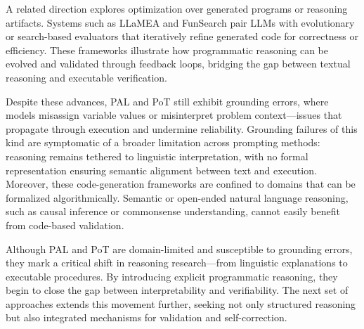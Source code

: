 \documentclass[project]{bsu-cs}  %
\begin{document}
A related direction explores optimization over generated programs or reasoning artifacts. Systems such as LLaMEA \citep{zhou2024llamea} and FunSearch \citep{rombach2024funsearch} pair LLMs with evolutionary or search-based evaluators that iteratively refine generated code for correctness or efficiency. These frameworks illustrate how programmatic reasoning can be evolved and validated through feedback loops, bridging the gap between textual reasoning and executable verification.

Despite these advances, PAL and PoT still exhibit grounding errors, where models misassign variable values or misinterpret problem context—issues that propagate through execution and undermine reliability. Grounding failures of this kind are symptomatic of a broader limitation across prompting methods: reasoning remains tethered to linguistic interpretation, with no formal representation ensuring semantic alignment between text and execution. Moreover, these code-generation frameworks are confined to domains that can be formalized algorithmically. Semantic or open-ended natural language reasoning, such as causal inference or commonsense understanding, cannot easily benefit from code-based validation.

Although PAL and PoT are domain-limited and susceptible to grounding errors, they mark a critical shift in reasoning research—from linguistic explanations to executable procedures. By introducing explicit programmatic reasoning, they begin to close the gap between interpretability and verifiability. The next set of approaches extends this movement further, seeking not only structured reasoning but also integrated mechanisms for validation and self-correction. 
% 
%
%
% 
\end{document}
